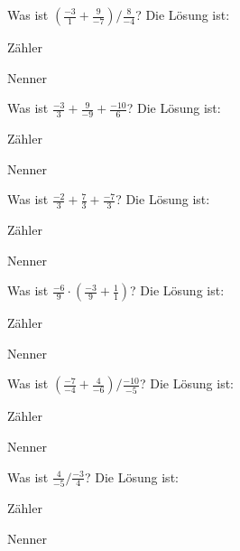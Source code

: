 \documentclass{ximera}
\begin{document}
\begin{shuffle}
\begin{question}
Was ist $(\frac{-3}{1}+\frac{9}{-7})/\frac{8}{-4}$?
Die Lösung ist:
\begin{solution}
Zähler 
\end{solution}
\begin{solution}
Nenner 
\end{solution}
\end{question}


\begin{question}
Was ist $\frac{-3}{3}+\frac{9}{-9}+\frac{-10}{6}$?
Die Lösung ist:
\begin{solution}
Zähler 
\end{solution}
\begin{solution}
Nenner 
\end{solution}
\end{question}


\begin{question}
Was ist $\frac{-2}{3}+\frac{7}{3}+\frac{-7}{3}$?
Die Lösung ist:
\begin{solution}
Zähler 
\end{solution}
\begin{solution}
Nenner 
\end{solution}
\end{question}


\begin{question}
Was ist $\frac{-6}{9}\cdot(\frac{-3}{9}+\frac{1}{1})$?
Die Lösung ist:
\begin{solution}
Zähler 
\end{solution}
\begin{solution}
Nenner 
\end{solution}
\end{question}


\begin{question}
Was ist $(\frac{-7}{-4}+\frac{4}{-6})/\frac{-10}{-5}$?
Die Lösung ist:
\begin{solution}
Zähler 
\end{solution}
\begin{solution}
Nenner 
\end{solution}
\end{question}


\begin{question}
Was ist $\frac{4}{-5}/\frac{-3}{4}$?
Die Lösung ist:
\begin{solution}
Zähler 
\end{solution}
\begin{solution}
Nenner 
\end{solution}
\end{question}



\end{shuffle}
\end{document}

